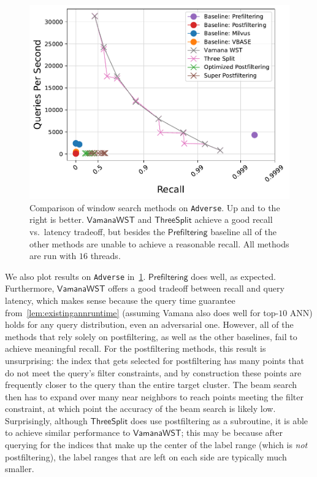 \documentclass{article}
\theoremstyle{plain}
\theoremstyle{definition}
\theoremstyle{remark}
\newcommand{\julian}[1]{{\color{red}{\bf Julian:} #1}}
\newcommand{\laxman}[1]{{\color{teal}{\bf Laxman:} #1}}
\newcommand{\datasetname}[1]{\texttt{#1}}
\newcommand{\algname}[1]{\ensuremath{\mathsf{#1}}}
\begin{document}
\begin{figure}[t]
\centerline{\includegraphics[width=0.9\columnwidth]{images/adversarial-100-angular_results_vamana.pdf}}
\caption{Comparison of window search methods on \datasetname{Adverse}. Up and to the right is better. \algname{Vamana WST} and \algname{Three Split} achieve a good recall vs.\ latency tradeoff, but besides the \algname{Prefiltering} baseline all of the other methods are unable to achieve a reasonable recall. All methods are run with $16$ threads. 
}
\label{fig:adversarial_results}
\end{figure}

We also plot results on \datasetname{Adverse} in~\cref{fig:adversarial_results}.
\algname{Prefiltering} does well, as expected. Furthermore, \algname{Vamana WST} offers a good tradeoff between recall and query latency, which makes sense because the query time guarantee from~\cref{lem:existingannruntime} (assuming Vamana also does well for top-$10$ ANN) holds for any query distribution, even an adversarial one.
However, all of the methods that rely solely on postfiltering, as well as the other baselines, fail to achieve meaningful recall. For the postfiltering methods, this result is unsurprising: the index that gets selected for postfiltering has many points that do not meet the query's filter constraints, and by construction these points are frequently closer to the query than the entire target cluster. The beam search then has to expand over many near neighbors to reach points meeting the filter constraint, at which point the accuracy of the beam search is likely low. Surprisingly, although \algname{Three Split} does use postfiltering as a subroutine, it is able to achieve similar performance to \algname{Vamana WST}; this may be because after querying for the indices that make up the center of the label range (which is \textit{not} postfiltering), the label ranges that are left on each side are typically much smaller. 
\end{document}
